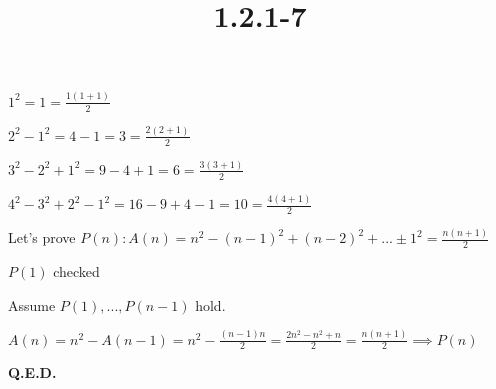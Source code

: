 \documentclass{article}
\title{1.2.1-7}
\begin{document}
\maketitle

\( 1^2 = 1 = \frac{1(1+1)}{2} \)

\( 2^2 - 1^2 = 4-1=3=\frac{2(2+1)}{2} \)

\( 3^2-2^2+1^2=9-4+1=6=\frac{3(3+1)}{2} \)

\( 4^2-3^2+2^2-1^2=16-9+4-1=10=\frac{4(4+1)}{2} \)

Let's prove \( P(n): A(n) = n^2 - (n-1)^2 + (n-2)^2 + ... \pm 1^2 = \frac{n(n+1)}{2} \)

\( P(1) \) checked

Assume \( P(1), ..., P(n-1) \) hold.

\( A(n) = n^2 - A(n-1) =n^2 - \frac{(n-1)n}{2}=\frac{2n^2-n^2+n}{2}=\frac{n(n+1)}{2} \implies P(n) \)

\textbf{Q.E.D.}
\end{document}
